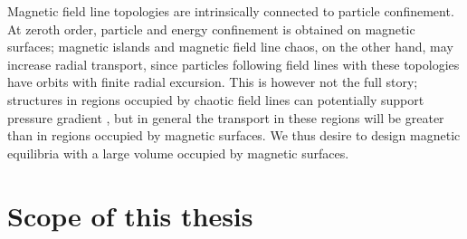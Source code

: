 \documentclass[my_thesis.tex]{subfiles}
\begin{document}


Magnetic field line topologies are intrinsically connected to particle confinement. At zeroth order, particle and energy confinement is obtained on magnetic surfaces; magnetic islands and magnetic field line chaos, on the other hand, may increase radial transport, since particles following field lines with these topologies have orbits with finite radial excursion. This is however not the full story; structures in regions occupied by chaotic field lines can potentially support pressure gradient \citep{Hudson2008}, but in general the transport in these regions will be greater than in regions occupied by magnetic surfaces. We thus desire to design magnetic equilibria with a large volume occupied by magnetic surfaces. 


\section{Scope of this thesis}
\end{document}
